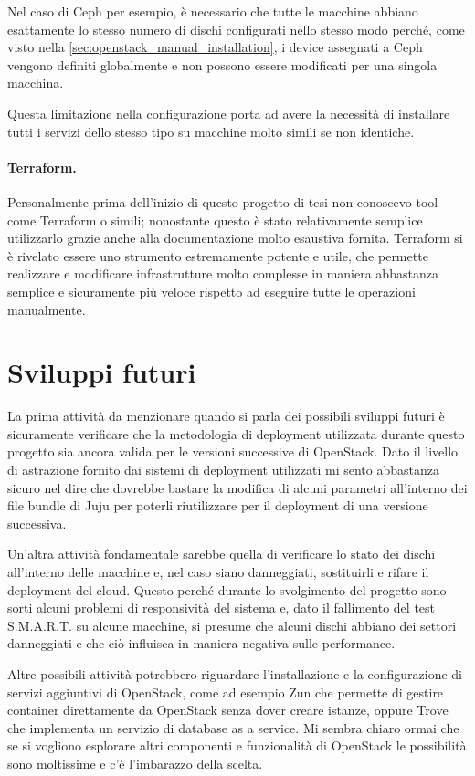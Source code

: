 Nel caso di Ceph per esempio, è necessario che tutte le macchine abbiano esattamente lo stesso numero di dischi configurati nello stesso modo perché, come visto nella \cref{sec:openstack_manual_installation}, i device assegnati a Ceph vengono definiti globalmente e non possono essere modificati per una singola macchina.

Questa limitazione nella configurazione porta ad avere la necessità di installare tutti i servizi dello stesso tipo su macchine molto simili se non identiche.

\paragraph{Terraform.} Personalmente prima dell'inizio di questo progetto di tesi non conoscevo tool come Terraform o simili; nonostante questo è stato relativamente semplice utilizzarlo grazie anche alla documentazione molto esaustiva fornita. Terraform si è rivelato essere uno strumento estremamente potente e utile, che permette realizzare e modificare infrastrutture molto complesse in maniera abbastanza semplice e sicuramente più veloce rispetto ad eseguire tutte le operazioni manualmente.

\section{Sviluppi futuri}

La prima attività da menzionare quando si parla dei possibili sviluppi futuri è sicuramente verificare che la metodologia di deployment utilizzata durante questo progetto sia ancora valida per le versioni successive di OpenStack. Dato il livello di astrazione fornito dai sistemi di deployment utilizzati mi sento abbastanza sicuro nel dire che dovrebbe bastare la modifica di alcuni parametri all'interno dei file bundle di Juju per poterli riutilizzare per il deployment di una versione successiva.

Un'altra attività fondamentale sarebbe quella di verificare lo stato dei dischi all'interno delle macchine e, nel caso siano danneggiati, sostituirli e rifare il deployment del cloud. Questo perché durante lo svolgimento del progetto sono sorti alcuni problemi di responsività del sistema e, dato il fallimento del test S.M.A.R.T. su alcune macchine, si presume che alcuni dischi abbiano dei settori danneggiati e che ciò influisca in maniera negativa sulle performance.

Altre possibili attività potrebbero riguardare l'installazione e la configurazione di servizi aggiuntivi di OpenStack, come ad esempio Zun che permette di gestire container direttamente da OpenStack senza dover creare istanze, oppure Trove che implementa un servizio di database as a service. Mi sembra chiaro ormai che se si vogliono esplorare altri componenti e funzionalità di OpenStack le possibilità sono moltissime e c'è l'imbarazzo della scelta.
